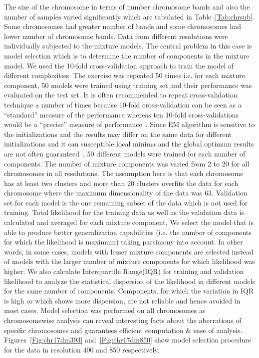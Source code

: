 The size of the chromosome in terms of number chromosome bands and also the number of samples varied significantly which are tabulated in Table~\ref{Tab:chrsub}. Some chromosomes had greater number of bands and some chromosomes had lower number of chromosome bands. Data from different resolutions were individually subjected to the mixture models. The central problem in this case is model selection which is to determine the number of components in the mixture model. We used the 10-fold cross-validation approach to train the model of different complexities. The exercise was repeated 50 times i.e. for each mixture component, 50 models were trained using training set and their performance was evaluated on the test set. It is often recommended to repeat cross-validation technique a number of times because 10-fold cross-validation can be seen as a ``standard'' measure of the performance whereas ten 10-fold cross-validations would be a ``precise'' measure of performance~\cite{kayphdthesis}. Since EM algorithm is sensitive to the initializations and the results may differ on the same data for different initializations and it can susceptible local minima and the global optimum results are not often guaranteed~\cite{embook}, 50 different models were trained for each number of components. The number of mixture components was varied from 2 to 20 for all chromosomes in all resolutions. The assumption here is that each chromosome has at least two clusters and more than 20 clusters overfits the data for each chromosome where the maximum dimensionality of the data was 63. Validation set for each model is the one remaining subset of the data which is not used for training. Total likelihood for the training data as well as the validation data is calculated and averaged for each mixture component. We select the model that is able to produce better generalization capabilities (i.e. the number of components for which the likelihood is maximum) taking parsimony into account. In other words, in some cases, models with lesser mixture components are selected instead of models with the larger number of mixture components for which likelihood was higher. We also calculate Interquartile Range(IQR) for training and validation likelihood to analyze the statistical dispersion of the likelihood in different models for the same number of components. Components, for which the variation in IQR is high or which shows more dispersion, are not reliable and hence avoided in most cases. Model selection was performed on all chromosomes as chromosomewise analysis can reveal interesting facts about the aberrations of specific chromosomes and guarantees efficient computation \& ease of analysis. Figures~\ref{Fig:chr17dm393} and~\ref{Fig:chr17dm850} show model selection procedure for the data in resolution 400 and 850 respectively.

